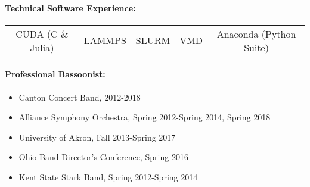 \documentclass{my_cv}
\begin{document}
\paragraph{Technical Software Experience:}
\begin{center}
\begin{tabular}{c|c|c|c|c}
   CUDA (C \& Julia) & LAMMPS & SLURM & VMD & Anaconda (Python Suite) \\
\end{tabular}
\end{center}

\paragraph{Professional Bassoonist:}
\begin{itemize}
	\item Canton Concert Band, 2012-2018
	\item Alliance Symphony Orchestra, Spring 2012-Spring 2014, Spring 2018
    \item University of Akron, Fall 2013-Spring 2017
	\item Ohio Band Director’s Conference, Spring 2016
	\item Kent State Stark Band, Spring 2012-Spring 2014
\end{itemize}
\end{document}
